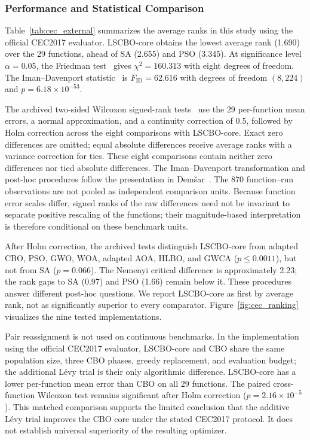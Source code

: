 \documentclass[pdflatex,onecolumn,sn-mathphys-num]{sn-jnl}
\begin{document}
\FloatBarrier
\subsubsection{Performance and Statistical Comparison}\label{sec:cec_levy_ablation}
Table~\ref{tab:cec_external} summarizes the average ranks in this study using the official CEC2017 evaluator. LSCBO-core obtains the lowest average rank (1.690) over the 29 functions, ahead of SA (2.655) and PSO (3.345). At significance level $\alpha=0.05$, the Friedman test~\cite{Friedman1937} gives $\chi^2=160.313$ with eight degrees of freedom. The Iman--Davenport statistic~\cite{ImanDavenport1980} is $F_{\mathrm{ID}}=62.616$ with degrees of freedom $(8,224)$ and $p=6.18\times10^{-53}$.

The archived two-sided Wilcoxon signed-rank tests~\cite{Wilcoxon1945} use the 29 per-function mean errors, a normal approximation, and a continuity correction of 0.5, followed by Holm correction across the eight comparisons with LSCBO-core. Exact zero differences are omitted; equal absolute differences receive average ranks with a variance correction for ties. These eight comparisons contain neither zero differences nor tied absolute differences. The Iman--Davenport transformation and post-hoc procedures follow the presentation in Dem\v{s}ar~\cite{Demsar2006}. The 870 function--run observations are not pooled as independent comparison units. Because function error scales differ, signed ranks of the raw differences need not be invariant to separate positive rescaling of the functions; their magnitude-based interpretation is therefore conditional on these benchmark units.

After Holm correction, the archived tests distinguish LSCBO-core from adapted CBO, PSO, GWO, WOA, adapted AOA, HLBO, and GWCA ($p\leq0.0011$), but not from SA ($p=0.066$). The Nemenyi critical difference is approximately 2.23; the rank gaps to SA (0.97) and PSO (1.66) remain below it. These procedures answer different post-hoc questions. We report LSCBO-core as first by average rank, not as significantly superior to every comparator. Figure~\ref{fig:cec_ranking} visualizes the nine tested implementations.


Pair reassignment is not used on continuous benchmarks. In the implementation using the official CEC2017 evaluator, LSCBO-core and CBO share the same population size, three CBO phases, greedy replacement, and evaluation budget; the additional L\'{e}vy trial is their only algorithmic difference. LSCBO-core has a lower per-function mean error than CBO on all 29 functions. The paired cross-function Wilcoxon test remains significant after Holm correction ($p=2.16\times10^{-5}$). This matched comparison supports the limited conclusion that the additive L\'{e}vy trial improves the CBO core under the stated CEC2017 protocol. It does not establish universal superiority of the resulting optimizer.
\end{document}
